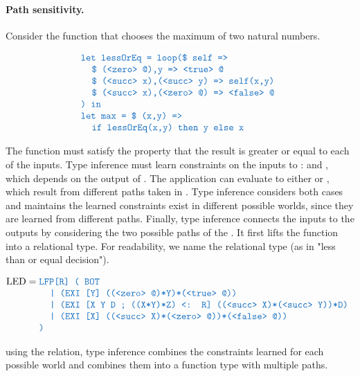 \documentclass[acmsmall]{acmart}
\theoremstyle{definition}
\begin{document}
\paragraph{Path sensitivity.} Consider the function  that chooses the maximum of two natural numbers. 



\[
  \begin{array}[t]{@{} l}
      \obj{let lessOrEq = loop(\$ self =>}
      \\
      \I \obj{\$ (<zero> @),y => <true> @}
      \\
      \I \obj{\$ (<succ> x),(<succ> y) => self(x,y)}
      \\
      \I \obj{\$ (<succ> x),(<zero> @) => <false> @}
      \\
      \obj{) in}
      \\
      \obj{let max = \$ (x,y) => }
      \\
      \I \obj{if lessOrEq(x,y) then y else x}
  \end{array}
\]


The function  must satisfy the property that the result is greater or equal to each of the inputs. 
Type inference must learn constraints on the inputs to :  and , which 
depends on the output of . The application  can evaluate to either 
or , which result from different paths taken in . 
Type inference considers both cases and maintains the learned constraints
exist in different possible worlds, since they are learned from different paths. Finally, type inference
connects the inputs to the outputs by considering the two possible paths of the .
It first lifts the function  into a relational type. For readability, we name the relational type  (as in "less than or equal decision"). 

\[
  \text{LED} = 
  \begin{array}[t]{@{} l}
      \obj{LFP[R] ( BOT}
      \\
      \I \obj{| (EXI [Y] ((<zero> @)*Y)*(<true> @))}
      \\
      \I \obj{| (EXI [X Y D ; ((X*Y)*Z) <: R] ((<succ> X)*(<succ> Y))*D)}
      \\
      \I \obj{| (EXI [X] ((<succ> X)*(<zero> @))*(<false> @))}
      \\
      \obj{)}
  \end{array}
\]

using the  relation, type inference combines the constraints learned
for each possible world and combines them into a function type with multiple paths. 
\end{document}
